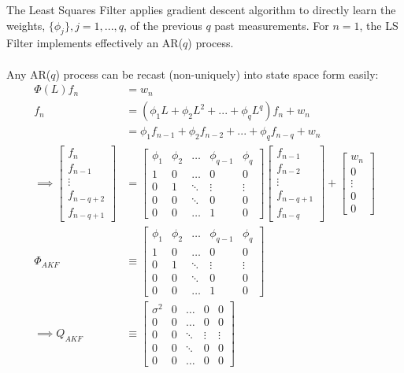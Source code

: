 The Least Squares Filter applies gradient descent algorithm to directly learn the weights, $\{\phi_j\}, j = 1, ... , q $, of the previous $q$ past measurements. For $n=1$, the LS Filter implements effectively an AR($q$) process. 
\\
\\
Any AR($q$) process can be recast (non-uniquely) into state space form easily:
\begin{align}
\Phi(L) f_n & = w_n \\
f_n & = (\phi_1 L +  \phi_2 L^2  + ... + \phi_q L^q) f_n + w_n \\ 
& = \phi_1 f_{n-1}  +  \phi_2 f_{n-2}   + ... + \phi_q f_{n-q} + w_n \\ 
\implies \begin{bmatrix}
f_{n} \\  
f_{n-1} \\ 
\vdots \\ 
f_{n-q + 2} \\ 
f_{n-q+1} 
\end{bmatrix} & = 
\begin{bmatrix}
\phi_1 & \phi_2 & \hdots & \phi_{q-1} & \phi_q \\ 
1 & 0 & \hdots & 0 & 0 \\  
0 & 1 & \ddots & \vdots & \vdots \\ 
0 & 0 & \ddots & 0 & 0 \\ 
0 & 0 & \hdots & 1 & 0 
\end{bmatrix}
\begin{bmatrix}
f_{n-1} \\  
f_{n-2} \\ 
\vdots \\  
f_{n-q + 1} \\ 
f_{n-q} 
\end{bmatrix}
 + \begin{bmatrix}
w_{n} \\  
0 \\ 
\vdots \\  
0 \\ 
0 
\end{bmatrix} \\
\Phi_{AKF} & \equiv 
\begin{bmatrix}
\phi_1 & \phi_2 & \hdots & \phi_{q-1} & \phi_q \\ 
1 & 0 & \hdots & 0 & 0 \\  
0 & 1 & \ddots & \vdots & \vdots \\ 
0 & 0 & \ddots & 0 & 0 \\ 
0 & 0 & \hdots & 1 & 0 
\end{bmatrix} \label{eqn:akf_Phi}\\
\implies Q_{AKF} & \equiv 
\begin{bmatrix}
\sigma^2 & 0 & \hdots & 0 & 0 \\ 
0 & 0 & \hdots & 0 & 0 \\  
0 & 0 & \ddots & \vdots & \vdots \\ 
0 & 0 & \ddots & 0 & 0 \\ 
0 & 0 & \hdots & 0 & 0 
\end{bmatrix} \label{eqn:akf_Q}
\end{align}

